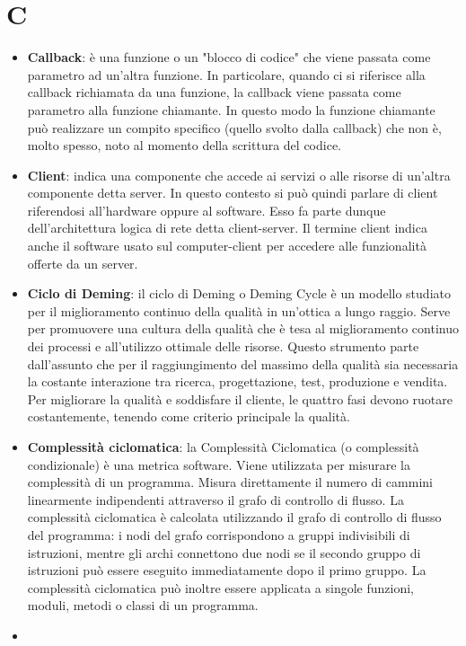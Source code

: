 \section{C}
\begin{itemize}
\item
	\textbf{Callback}: è una funzione o un "blocco di codice" che viene passata come parametro ad un'altra funzione. In particolare, quando ci si riferisce alla callback richiamata da una funzione, la callback viene passata come parametro alla funzione chiamante. In questo modo la funzione chiamante può realizzare un compito specifico (quello svolto dalla callback) che non è, molto spesso, noto al momento della scrittura del codice.
	\item
	\textbf{Client}: indica una componente che accede ai servizi o alle risorse di un'altra componente detta server. In questo contesto si può quindi parlare di client riferendosi all'hardware oppure al software. Esso fa parte dunque dell'architettura logica di rete detta client-server.
Il termine client indica anche il software usato sul computer-client per accedere alle funzionalità offerte da un server.
	\item
	\textbf{Ciclo di Deming}: il ciclo di Deming o Deming Cycle è un modello studiato per il miglioramento continuo della qualità in un'ottica a lungo raggio. Serve per promuovere una cultura della qualità che è tesa al miglioramento continuo dei processi e all'utilizzo ottimale delle risorse. Questo strumento parte dall'assunto che per il raggiungimento del massimo della qualità sia necessaria la costante interazione tra ricerca, progettazione, test, produzione e vendita. Per migliorare la qualità e soddisfare il cliente, le quattro fasi devono ruotare costantemente, tenendo come criterio principale la qualità.
	\item
	\textbf{Complessità ciclomatica}: la Complessità Ciclomatica (o complessità condizionale) è una metrica software. Viene utilizzata per misurare la complessità di un programma. Misura direttamente il numero di cammini linearmente indipendenti attraverso il grafo di controllo di flusso. La complessità ciclomatica è calcolata utilizzando il grafo di controllo di flusso del programma: i nodi del grafo corrispondono a gruppi indivisibili di istruzioni, mentre gli archi connettono due nodi se il secondo gruppo di istruzioni può essere eseguito immediatamente dopo il primo gruppo. La complessità ciclomatica può inoltre essere applicata a singole funzioni, moduli, metodi o classi di un programma.
	\item

\end{itemize}
